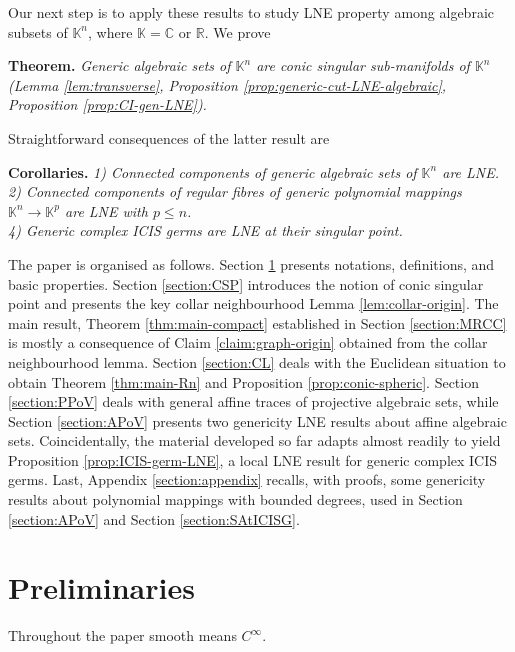 \documentclass[11pt]{amsart}
\newcommand{\field}[1]{\mathbb{#1}}
\newcommand{\C}{\field{C}}
\newcommand{\K}{\field{K}}
\newcommand{\R}{\field{R}}
\newcommand{\Kn}{{\K^n}}
\newcommand{\Kp}{{\K^p}}
\numberwithin{equation}{section}
\numberwithin{equation}{section}
\begin{document}
\medskip
Our next step is to apply these results to study LNE property 
among algebraic subsets of $\Kn$, where $\K=\C$ or $\R$. We prove

\medskip\noindent
{\bf Theorem.} \em
Generic algebraic sets of $\Kn$ are conic singular sub-manifolds of $\Kn$
(Lemma \ref{lem:transverse}, Proposition \ref{prop:generic-cut-LNE-algebraic},
Proposition \ref{prop:CI-gen-LNE}). \em

\medskip
Straightforward consequences of the latter result are 

\medskip\noindent
{\bf Corollaries.} \em
1) Connected components of generic algebraic sets of $\Kn$ are LNE.
\\
2) Connected components of regular fibres of generic polynomial 
mappings $\Kn \to \Kp$ are LNE with $p\leq n$.
\\
4) Generic complex ICIS germs are LNE at their singular point.
\em

\medskip
The paper is organised as follows. Section \ref{section:LNE} presents 
notations, definitions, and basic properties.
Section \ref{section:CSP} introduces the notion of conic 
singular point and presents the key collar neighbourhood Lemma 
\ref{lem:collar-origin}. The main result, Theorem \ref{thm:main-compact} 
established in Section \ref{section:MRCC} is mostly a consequence of 
Claim \ref{claim:graph-origin} obtained from the collar neighbourhood lemma. 
Section \ref{section:CL} deals with the Euclidean situation to obtain Theorem 
\ref{thm:main-Rn} and Proposition \ref{prop:conic-spheric}.
Section \ref{section:PPoV} deals with general affine traces of projective algebraic sets, 
while Section \ref{section:APoV} presents two genericity LNE results about affine algebraic sets. Coincidentally,
the material developed so far adapts almost readily to yield Proposition 
\ref{prop:ICIS-germ-LNE}, a local LNE result for generic complex ICIS 
germs. Last, Appendix \ref{section:appendix} recalls, with proofs, 
some genericity results about polynomial mappings with bounded degrees,
used in Section \ref{section:APoV} and Section 
\ref{section:SAtICISG}. 
%
%
%
%
%
%
%
%
%
%
%
%
%
%
%
%
%
%
%
%
%
%
%
%
%
%
%
%
%
%
%
%
%
%
%
%
%
%
%
%
%
%
%
%
%

\section{Preliminaries}\label{section:LNE}
%
%
Throughout the paper smooth means $C^\infty$.
\end{document}
